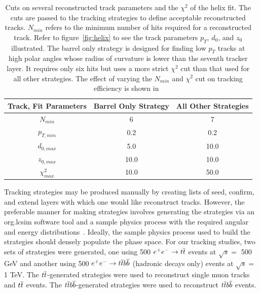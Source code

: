 \begin{table}[t]
\begin{center}
\begin{small}
	\begin{tabular}{c||cc}
	\textbf{Track, Fit Parameters} & \textbf{Barrel Only Strategy} & \textbf{All Other Strategies} \\
	\hline \hline
	$ N_{min} $ & 6 & 7 \\
	$ p_{T,min} $ & 0.2 & 0.2 \\
	$ d_{0,max} $ & 5.0 & 10.0 \\
	$ z_{0,max} $ & 10.0 & 10.0 \\
	$ \chi^{2}_{max} $ & 10.0 & 50.0 \\
	\end{tabular}
\caption{Cuts on several reconstructed track parameters and the $\chi^{2}$ of the helix fit.
The cuts are passed to the tracking strategies to define acceptable reconstructed tracks.
$N_{min}$ refers to the minimum number of hits required for a reconstructed track.
Refer to figure~\ref{fig:helix} to see the track parameters $p_{T}$, $d_{0}$, and $z_{0}$ illustrated.
The barrel only strategy is designed for finding low $p_{T}$ tracks at high polar angles
whose radius of curvature is lower than the seventh tracker layer.
It requires only six hits but uses a more strict $\chi^{2}$ cut
than that used for all other strategies.
The effect of varying the $N_{min}$ and $\chi^{2}$ cut on tracking efficiency
is shown in~\cite{Grefe:2014pba}}
\label{tab:stratCuts}
\end{small}
\end{center}
\end{table}

Tracking strategies may be produced manually
by creating lists of seed, confirm, and extend layers
with which one would like reconstruct tracks.
However, the preferable manner for making
strategies involves generating the strategies
via an org.lcsim software tool and a sample physics process
with the required angular and energy distributions~\cite{Grefe:2014pba}.
Ideally, the sample physics process used to build
the strategies should densely
populate the phase space.
For our tracking studies,
two sets of strategies were generated, one using
500 $\ee \rightarrow \ttbar$ events at $ \sqrt{s} = $ 500 GeV
and another using 500 $\ee \rightarrow \ttbar \bbbar$ (hadronic decays only) events at $ \sqrt{s} = $ 1 TeV.
The $\ttbar$-generated strategies were used to reconstruct single muon tracks and $\ttbar$ events.
The $\ttbar \bbbar$-generated strategies were used to reconstruct $\ttbar \bbbar$ events.

